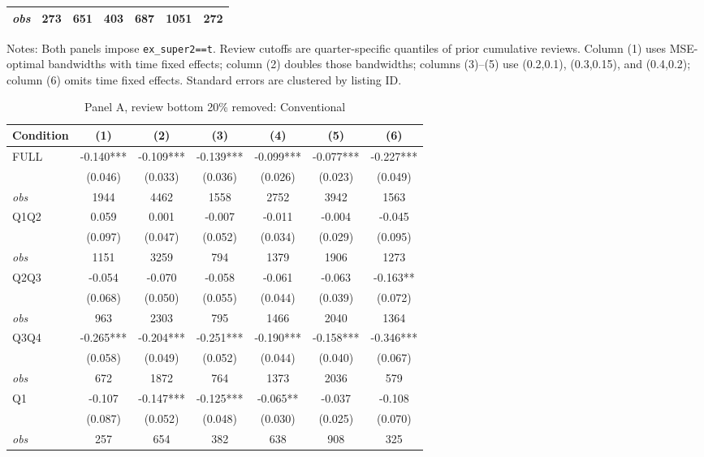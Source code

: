 \begin{table}[!htbp]
\begin{tabular}{lcccccc}
\textit{obs} & 273 & 651 & 403 & 687 & 1051 & 272 \\
\bottomrule
\end{tabular}
\begin{minipage}{0.98\textwidth}\footnotesize
Notes: Both panels impose \texttt{ex\_super2==t}. Review cutoffs are quarter-specific quantiles of prior cumulative reviews. Column (1) uses MSE-optimal bandwidths with time fixed effects; column (2) doubles those bandwidths; columns (3)--(5) use (0.2,0.1), (0.3,0.15), and (0.4,0.2); column (6) omits time fixed effects. Standard errors are clustered by listing ID.
\end{minipage}
\end{table}

\begin{table}[!htbp]
\centering
\caption{Panel A, review bottom 20\% removed: Conventional}
\begin{tabular}{lcccccc}
\toprule
Condition & (1) & (2) & (3) & (4) & (5) & (6) \\
\midrule
FULL & -0.140*** & -0.109*** & -0.139*** & -0.099*** & -0.077*** & -0.227*** \\
 & (0.046) & (0.033) & (0.036) & (0.026) & (0.023) & (0.049) \\
\textit{obs} & 1944 & 4462 & 1558 & 2752 & 3942 & 1563 \\
Q1Q2 & 0.059 & 0.001 & -0.007 & -0.011 & -0.004 & -0.045 \\
 & (0.097) & (0.047) & (0.052) & (0.034) & (0.029) & (0.095) \\
\textit{obs} & 1151 & 3259 & 794 & 1379 & 1906 & 1273 \\
Q2Q3 & -0.054 & -0.070 & -0.058 & -0.061 & -0.063 & -0.163** \\
 & (0.068) & (0.050) & (0.055) & (0.044) & (0.039) & (0.072) \\
\textit{obs} & 963 & 2303 & 795 & 1466 & 2040 & 1364 \\
Q3Q4 & -0.265*** & -0.204*** & -0.251*** & -0.190*** & -0.158*** & -0.346*** \\
 & (0.058) & (0.049) & (0.052) & (0.044) & (0.040) & (0.067) \\
\textit{obs} & 672 & 1872 & 764 & 1373 & 2036 & 579 \\
Q1 & -0.107 & -0.147*** & -0.125*** & -0.065** & -0.037 & -0.108 \\
 & (0.087) & (0.052) & (0.048) & (0.030) & (0.025) & (0.070) \\
\textit{obs} & 257 & 654 & 382 & 638 & 908 & 325 \\

\end{tabular}
\end{table}
